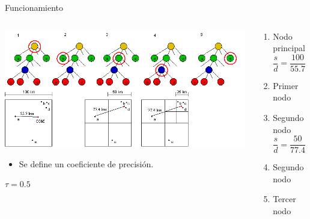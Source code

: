 \documentclass{beamer}
\begin{document}
\begin{frame}{Funcionamiento}
	\begin{columns}
		\begin{column}{0.6\textwidth}
			\centering
			\includegraphics[width=\linewidth]{sources/images/force.png}\\
			\begin{itemize}
				\item Se define un coeficiente de precisi\'on.
			\end{itemize}
			$\tau = 0.5$
			\pause
		\vspace{1cm}
		
		\end{column}
		\begin{column}{0.4\textwidth}
			\begin{enumerate}
				\footnotesize
				\item {\color{orange} Nodo principal} \pause
				\begin{equation*}
					\dfrac{s}{d} = \dfrac{100}{55.7} \approx 1.8 > \tau 
				\end{equation*}
				\pause
				\item {\color{green} Primer nodo} \pause
				\item {\color{green} Segundo nodo} \pause
				\begin{equation*}
					\dfrac{s}{d} = \dfrac{50}{77.4} \approx 0.6 > \tau
				\end{equation*}
				\pause
				\item {\color{blue} Segundo nodo} \pause
				\pause
				\item {\color{green} Tercer nodo} \pause
			\end{enumerate}
		\end{column}
	\end{columns}
\end{frame}
\end{document}
